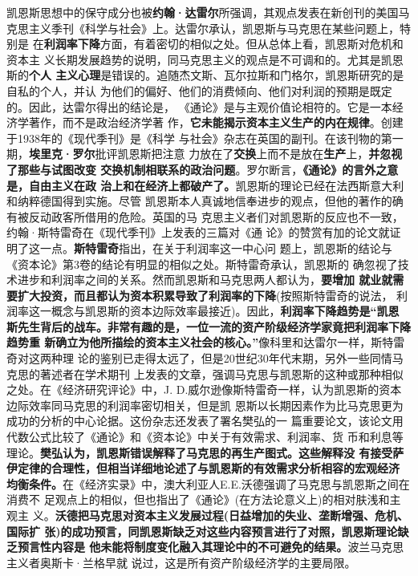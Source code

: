 凯恩斯思想中的保守成分也被\textbf{约翰·达雷尔}所强调，其观点发表在新创刊的美国马
克思主义季刊《科学与社会》上。达雷尔承认，凯恩斯与马克思在某些问题上，特别是
在\textbf{利润率下降}方面，有着密切的相似之处。但从总体上看，凯恩斯对危机和资本主
义长期发展趋势的说明，同马克思主义的观点是不可调和的。尤其是凯恩斯的\textbf{个人
  主义心理}是错误的。追随杰文斯、瓦尔拉斯和门格尔，凯恩斯研究的是自私的个人，并认
为他们的偏好、他们的消费倾向、他们对利润的预期是既定的。因此，达雷尔得出的结论是，
《通论》是与主观价值论相符的。它是一本经济学著作，而不是政治经济学著
作，\textbf{它未能揭示资本主义生产的内在规律}。创建于1938年的《现代季刊》是《科学
与社会》杂志在英国的副刊。在该刊物的第一期，\textbf{埃里克·罗尔}批评凯恩斯把注意
力放在了\textbf{交换}上而不是放在\textbf{生产}上，\textbf{并忽视了那些与试图改变
  交换机制相联系的政治问题}。罗尔断言，\textbf{《通论》的言外之意是，自由主义在政
  治上和在经济上都破产了。}凯恩斯的理论已经在法西斯意大利和纳粹德国得到实施。尽管
凯恩斯本人真诚地信奉进步的观点，但他的著作的确有被反动政客所借用的危险。英国的马
克思主义者们对凯恩斯的反应也不一致，约翰·斯特雷奇在《现代季刊》上发表的三篇对《通
论》的赞赏有加的论文就证明了这一点。\textbf{斯特雷奇}指出，在关于利润率这一中心问
题上，凯恩斯的结论与《资本论》第3卷的结论有明显的相似之处。斯特雷奇承认，凯恩斯的
确忽视了技术进步和利润率之间的关系。然而凯恩斯和马克思两人都认为，\textbf{要增加
  就业就需要扩大投资，而且都认为资本积累导致了利润率的下降}(按照斯特雷奇的说法，
利润率这一概念与凯恩斯的资本边际效率最接近)。因此，\textbf{利润率下降趋势是“凯恩
  斯先生背后的战车。非常有趣的是，一位一流的资产阶级经济学家竟把利润率下降趋势重
  新确立为他所描绘的资本主义社会的核心。”}像科里和达雷尔一样，斯特雷奇对这两种理
论的鉴别已走得太远了，但是20世纪30年代末期，另外一些同情马克思的著述者在学术期刊
上发表的文章，强调马克思与凯恩斯的这种或那种相似之处。在《经济研究评论》中，J.
D.威尔逊像斯特雷奇一样，认为凯恩斯的资本边际效率同马克思的利润率密切相关，但是凯
恩斯以长期因素作为比马克思更为成功的分析的中心论据。这份杂志还发表了署名樊弘的一
篇重要论文，该论文用代数公式比较了《通论》和《资本论》中关于有效需求、利润率、货
币和利息等理论。\textbf{樊弘认为，凯恩斯错误解释了马克思的再生产图式。这些解释没
  有接受萨伊定律的合理性，但相当详细地论述了与凯恩斯的有效需求分析相容的宏观经济
  均衡条件。}在《经济实录》中，澳大利亚人E.E.沃德强调了马克思与凯恩斯之间在消费不
足观点上的相似，但也指出了《通论》(在方法论意义上)的相对肤浅和主观主
义。\textbf{沃德把马克思对资本主义发展过程(日益增加的失业、垄断增强、危机、国际扩
  张)的成功预言，同凯恩斯缺乏对这些内容预言进行了对照，凯恩斯理论缺乏预言性内容是
  他未能将制度变化融入其理论中的不可避免的结果。}波兰马克思主义者奥斯卡·兰格早就
说过，这是所有资产阶级经济学的主要局限。

